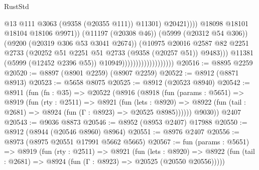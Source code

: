 \begin{lexlean}{RustStd}
\begin{coremodule}
                                                          @13
                                                          @111
                                                          @3063
                                                          (@9358 (@20355 @111))
                                                          @11301)
                                                        @20421))))
                                                @18098
                                                @18101
                                                @18104
                                                @18106
                                                @9971))
                                            (@11197 (@20308 @46))
                                            (@5999 (@20312 @54 @306))
                                            (@9200 (@20319 @306 @53 @3041 @2674))
                                            (@10975
                                              @20016
                                              @2587
                                              @82
                                              @2251
                                              @2733
                                              (@20252
                                                @51
                                                @2251
                                                @51
                                                @2733
                                                (@9358 (@20257 @51))
                                                @9483)))
                                          @11381
                                          (@5999 (@12452 @2396 @55))
                                          @10949)))))))))))))))))))
@20516 := @8895 @2259
@20520 := @8897 (@8901 @2259) (@8907 @2259)
@20522 := @8912 (@8871 @8913)
@20523 := @5658 @8075
@20525 := @8912 (@20523 @8940)
@20542 := @8911
    (fun (fn : @35) =>
    @20522
      (@8916
        (@8918
          (fun (params : @5651) =>
          @8919
            (fun (rty : @2511) =>
            @8921
              (fun (lets : @8920) =>
              @8922 (fun (tail : @2681) => @8924 (fun (Γ : @8923) => @20525 @8985))))))
        @9030))
    @2407
@20543 := @9036 @8873
@20546 := @8952 (@8953 @2407) @17988
@20550 := @8912 (@8944 (@20546 @8960) @8964)
@20551 := @8976 @2407
@20556 := @8973 (@8975 @20551 @17991 @5662 @5665)
@20567 := fun (params : @5651) =>
  @8919
    (fun (rty : @2511) =>
    @8921
      (fun (lets : @8920) =>
      @8922 (fun (tail : @2681) => @8924 (fun (Γ : @8923) => @20525 (@20550 @20556)))))

\end{coremodule}
\end{lexlean}
